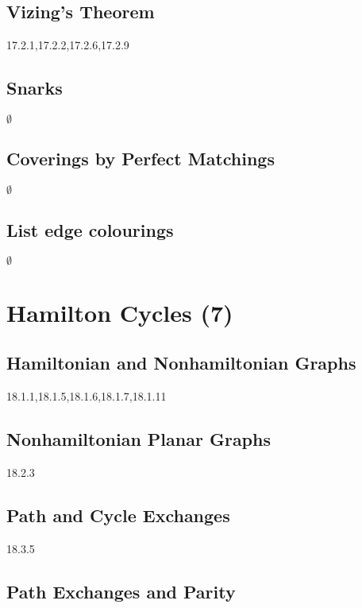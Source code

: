 \documentclass[12pt]{article}
\begin{document}
\subsection{Vizing’s Theorem}

17.2.1,17.2.2,17.2.6,17.2.9

\subsection{Snarks}

$\emptyset$

\subsection{Coverings by Perfect Matchings}

$\emptyset$

\subsection{List edge colourings}

$\emptyset$



\newpage

\section{Hamilton Cycles (7)}

\subsection{Hamiltonian and Nonhamiltonian Graphs}

18.1.1,18.1.5,18.1.6,18.1.7,18.1.11

\subsection{Nonhamiltonian Planar Graphs}

18.2.3

\subsection{Path and Cycle Exchanges}

18.3.5

\subsection{Path Exchanges and Parity}
\end{document}

